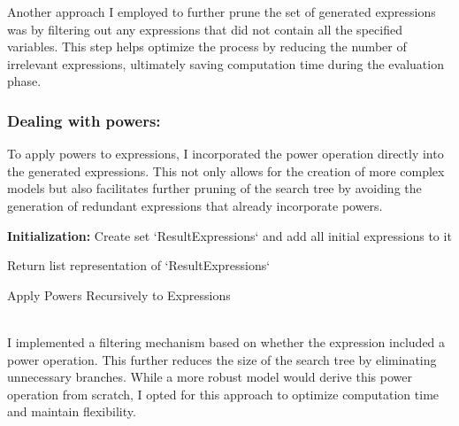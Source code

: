\documentclass{article}
\begin{document}
Another approach I employed to further prune the set of generated expressions was by filtering out any expressions that did not contain all the specified variables. This step helps optimize the process by reducing the number of irrelevant expressions, ultimately saving computation time during the evaluation phase.\\


\subsubsection{Dealing with powers:}

To apply powers to expressions, I incorporated the power operation directly into the generated expressions. This not only allows for the creation of more complex models but also facilitates further pruning of the search tree by avoiding the generation of redundant expressions that already incorporate powers.\\



\begin{algorithm}[H]
\SetAlgoLined
{}

\textbf{Initialization:}\;
Create set `ResultExpressions` and add all initial expressions to it\;


Return list representation of `ResultExpressions`\;

\caption{Apply Powers Recursively to Expressions}
\label{alg:apply_powers} %
\end{algorithm}\\




I implemented a filtering mechanism based on whether the expression included a power operation. This further reduces the size of the search tree by eliminating unnecessary branches. While a more robust model would derive this power operation from scratch, I opted for this approach to optimize computation time and maintain flexibility.\\
\end{document}
